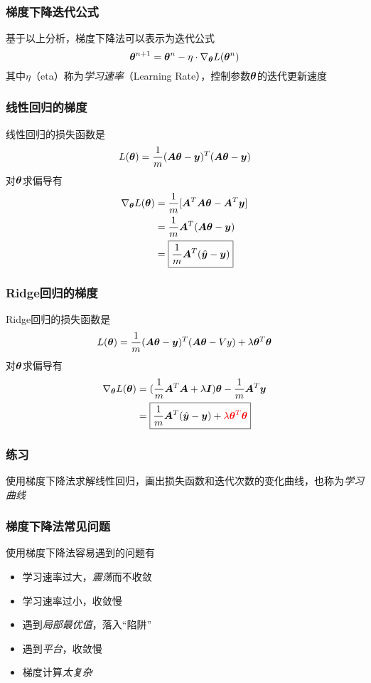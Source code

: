 \documentclass[14pt]{beamer}
\begin{document}
\begin{frame}
  \frametitle{梯度下降迭代公式}
  基于以上分析，梯度下降法可以表示为迭代公式
  \begin{equation}
    \bm{\theta}^{n+1}=\bm{\theta}^n-\eta\cdot\nabla_{\bm{\theta}} L(\bm{\theta}^n)
  \end{equation}
  其中$\eta$（eta）称为\emph{学习速率}（Learning Rate），控制参数$\bm{\theta}$的迭代更新速度
\end{frame}

\begin{frame}
  \frametitle{线性回归的梯度}
      线性回归的损失函数是
      \begin{equation*}
        L(\bm{\theta})=\frac{1}{m}(\bm{A}\bm{\theta}-\bm{y})^T(\bm{A}\bm{\theta}-\bm{y})
      \end{equation*}
      对$\bm{\theta}$求偏导有
      \begin{equation}\label{eq:gradient_ls}
        \begin{split}
        \nabla_{\bm{\theta}}L(\bm{\theta})&=\frac{1}{m}[\bm{A}^T\bm{A}\bm{\theta}-\bm{A}^T\bm{y}]\\
        &=\frac{1}{m}\bm{A}^T(\bm{A}\bm{\theta}-\bm{y})\\
        &=\boxed{\frac{1}{m}\bm{A}^T(\hat{\bm{y}}-\bm{y})}
        \end{split}
      \end{equation}
\end{frame}

\begin{frame}
  \frametitle{Ridge回归的梯度}
      Ridge回归的损失函数是
      \begin{equation*}
        L(\bm{\theta})=\frac{1}{m}(\bm{A}\bm{\theta}-\bm{y})^T(\bm{A}\bm{\theta}-Vy)+\lambda\bm{\theta}^T\bm{\theta}
      \end{equation*}
      对$\bm{\theta}$求偏导有
      \begin{equation}
        \begin{split}
        \nabla_{\bm{\theta}}L(\bm{\theta})&=(\frac{1}{m}\bm{A}^T\bm{A}+\lambda\bm{I})\bm{\theta}-\frac{1}{m}\bm{A}^T\bm{y}\\
        &=\boxed{\frac{1}{m}\bm{A}^T(\hat{\bm{y}}-\bm{y})+\color{red}{\lambda\bm{\theta}^T\bm{\theta}}}
        \end{split}
      \end{equation}
      
\end{frame}

\begin{frame}
  \frametitle{练习}
  使用梯度下降法求解线性回归，画出损失函数和迭代次数的变化曲线，也称为\emph{学习曲线}
\end{frame}

\begin{frame}
  \frametitle{梯度下降法常见问题}
  使用梯度下降法容易遇到的问题有
  \begin{itemize}
    \item 学习速率过大，\emph{震荡}而不收敛
    \item 学习速率过小，收敛慢
    \item 遇到\emph{局部最优值}，落入“陷阱”
    \item 遇到\emph{平台}，收敛慢
    \item 梯度计算\emph{太复杂}
  \end{itemize}
\end{frame}
\end{document}
